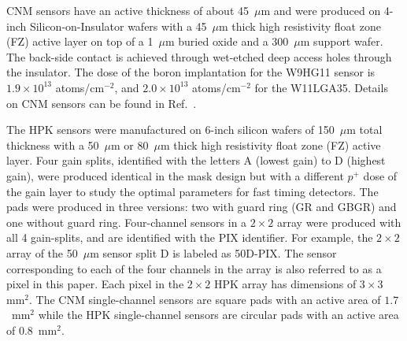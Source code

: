 \documentclass[preprint,1p]{elsarticle}
\begin{document}

CNM sensors have an active thickness of about 45~$\mu$m and were
produced on 4-inch Silicon-on-Insulator wafers with a 45~$\mu$m thick high
resistivity float zone (FZ) active layer on top of a 1~$\mu$m buried oxide and a
300~$\mu$m support wafer. The back-side contact is achieved through wet-etched
deep access holes through the insulator. The dose of the boron implantation for
the  W9HG11 sensor is $1.9\times10^{13}$ atoms/cm$^{-2}$,
and $2.0\times10^{13}$ atoms/cm$^{-2}$ for the W11LGA35. Details on CNM sensors
can be found in Ref.~\cite{CNMSensors, Cartiglia201783}. 

The HPK sensors were manufactured on 6-inch silicon wafers of 150~$\mu$m total
thickness with a 50~$\mu$m or 80~$\mu$m thick high resistivity float zone (FZ)
active layer. Four gain splits, identified with the letters A (lowest gain) to D
(highest gain), were produced identical in the mask design but with a different
$p^+$ dose of the gain layer to study the optimal parameters for fast timing
detectors. The pads were produced in three versions: two with guard ring (GR and
GBGR) and one without guard ring. Four-channel sensors in a $2\times 2$ array
were produced with all 4 gain-splits, and are identified with the PIX
identifier. For example, the $2\times 2$ array of the 50~$\mu$m sensor split D
is labeled as 50D-PIX. The sensor corresponding to each of the four channels in
the array is also referred to as a pixel in this paper. Each pixel in the
$2\times 2$ HPK array has dimensions of $3\times 3$~$\mathrm{mm}^{2}$. The CNM
single-channel sensors are square pads with an active area of
$1.7$~$\mathrm{mm}^{2}$ while the HPK single-channel sensors are circular pads
with an active area of $0.8$~$\mathrm{mm}^{2}$.
\end{document}
